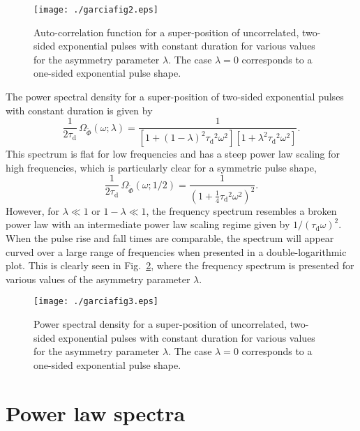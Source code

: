 \documentclass[aps,prb,12pt,a4paper,preprint,amsmath,amssymb,groupedaddress]{revtex4-1}
\newcommand{\taud}{\ensuremath{\tau_\text{d}}}
\newcommand{\Phiwt}{\ensuremath{\widetilde{\Phi}}}
\newcommand{\Figref}[1]{Fig.~\ref{#1}}
\begin{document}
\begin{figure}
\texttt{[image: ./garciafig2.eps]}
\caption{Auto-correlation function for a super-position of uncorrelated, two-sided exponential pulses with constant duration for various values for the asymmetry parameter $\lambda$. The case $\lambda=0$ corresponds to a one-sided exponential pulse shape.}
\label{fig:acf-exp-lambda}
\end{figure}


The power spectral density for a super-position of two-sided exponential pulses with constant duration is given by
\begin{equation}\label{psd-dexp}
\frac{1}{2\taud}\,\Omega_{\Phiwt}(\omega;\lambda) = \frac{1}{\left[ 1+(1-\lambda)^2\taud^2\omega^2 \right]\left[ 1+\lambda^2\taud^2\omega^2 \right]} .
\end{equation}
This spectrum is flat for low frequencies and has a steep power law scaling for high frequencies, which is particularly clear for a symmetric pulse shape,
\begin{equation}
\frac{1}{2\taud}\,\Omega_{\Phiwt}(\omega;1/2) = \frac{1}{\left( 1+\frac{1}{4}\taud^2\omega^2 \right)^2} .
\end{equation}
However, for $\lambda\ll1$ or $1-\lambda\ll1$, the frequency spectrum resembles a broken power law with an intermediate power law scaling regime given by $1/(\taud\omega)^2$. When the pulse rise and fall times are comparable, the spectrum will appear curved over a large range of frequencies when presented in a double-logarithmic plot. This is clearly seen in \Figref{fig:psd-exp-lambda}, where the frequency spectrum is presented for various values of the asymmetry parameter $\lambda$.


\begin{figure}
\texttt{[image: ./garciafig3.eps]}
\caption{Power spectral density for a super-position of uncorrelated, two-sided exponential pulses with constant duration for various values for the asymmetry parameter $\lambda$. The case $\lambda=0$ corresponds to a one-sided exponential pulse shape.}
\label{fig:psd-exp-lambda}
\end{figure}



\section{Power law spectra}\label{sec:powerlaw}
\end{document}
